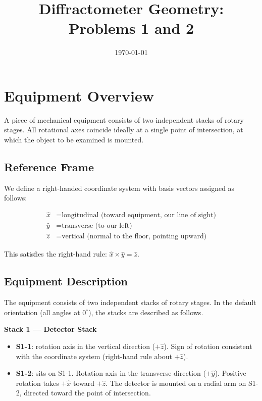 \documentclass[12pt]{article}
\title{Diffractometer Geometry: Problems 1 and 2}
\date{\today}
\begin{document}
\maketitle

\section*{Equipment Overview}

A piece of mechanical equipment consists of two independent stacks of rotary stages.
All rotational axes coincide ideally at a single point of intersection, at which the
object to be examined is mounted.

\subsection*{Reference Frame}

We define a right-handed coordinate system with basis vectors assigned as follows:

\begin{align*}
\hat{x} &= \text{longitudinal (toward equipment, our line of sight)} \\
\hat{y} &= \text{transverse (to our left)} \\
\hat{z} &= \text{vertical (normal to the floor, pointing upward)}
\end{align*}

This satisfies the right-hand rule: $\hat{x} \times \hat{y} = \hat{z}$.

\subsection*{Equipment Description}

The equipment consists of two independent stacks of rotary stages. In the default
orientation (all angles at $0^\circ$), the stacks are described as follows.

\textbf{Stack 1 --- Detector Stack}

\begin{itemize}
  \item \textbf{S1-1}: rotation axis in the vertical direction ($+\hat{z}$).
    Sign of rotation consistent with the coordinate system (right-hand rule about $+\hat{z}$).
  \item \textbf{S1-2}: sits on S1-1. Rotation axis in the transverse direction ($+\hat{y}$).
    Positive rotation takes $+\hat{x}$ toward $+\hat{z}$.
    The detector is mounted on a radial arm on S1-2, directed toward the point of intersection.
\end{itemize}
\end{document}
